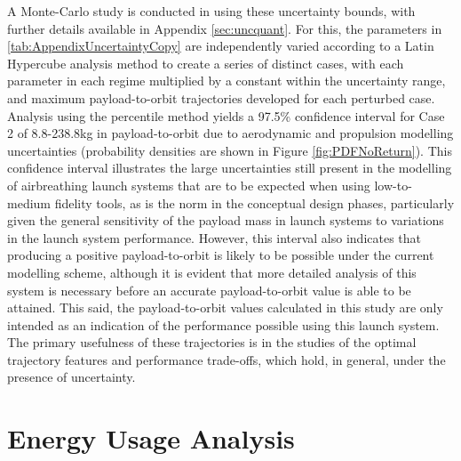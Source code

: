 A Monte-Carlo study is conducted in using these uncertainty bounds, with further details available in Appendix \ref{sec:uncquant}. For this, the parameters in \ref{tab:AppendixUncertaintyCopy} are independently varied according to a Latin Hypercube analysis method to create a series of distinct cases, with each parameter in each regime multiplied by a constant within the uncertainty range, and maximum payload-to-orbit trajectories developed for each perturbed case. 
Analysis using the percentile method yields a 97.5\% confidence interval for Case 2 of 8.8-238.8kg in payload-to-orbit due to aerodynamic and propulsion modelling uncertainties (probability densities are shown in Figure \ref{fig:PDFNoReturn}). This confidence interval illustrates the large uncertainties still present in the modelling of airbreathing launch systems that are to be expected when using low-to-medium fidelity tools, as is the norm in the conceptual design phases, particularly given the general sensitivity of the payload mass in launch systems to variations in the launch system performance. However, this interval also indicates that producing a positive payload-to-orbit is likely to be possible under the current modelling scheme, although it is evident that more detailed analysis of this system is necessary before an accurate payload-to-orbit value is able to be attained. This said, the payload-to-orbit values calculated in this study are only intended as an indication of the performance possible using this launch system. The primary usefulness of these trajectories is in the studies of the optimal trajectory features and performance trade-offs, which hold, in general, under the presence of uncertainty. 

\section{Energy Usage Analysis}\label{sec:exergy1}



